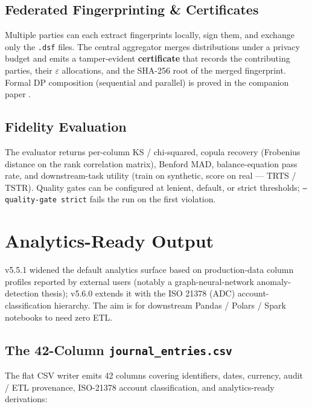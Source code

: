 \documentclass[11pt,a4paper]{article}
\begin{document}
\subsection{Federated Fingerprinting \& Certificates}

Multiple parties can each extract fingerprints locally, sign them, and
exchange only the \texttt{.dsf} files. The central aggregator merges
distributions under a privacy budget and emits a tamper-evident
\textbf{certificate} that records the contributing parties, their
$\varepsilon$ allocations, and the SHA-256 root of the merged fingerprint.
Formal DP composition (sequential and parallel) is proved in the companion
paper \citep{ivertowski2026datasynth}.

\subsection{Fidelity Evaluation}

The evaluator returns per-column KS / chi-squared, copula recovery
(Frobenius distance on the rank correlation matrix), Benford MAD,
balance-equation pass rate, and downstream-task utility (train on synthetic,
score on real --- TRTS / TSTR). Quality gates can be configured at lenient,
default, or strict thresholds; \texttt{--quality-gate strict} fails the run
on the first violation.

\newpage
\section{Analytics-Ready Output}

v5.5.1 widened the default analytics surface based on production-data column
profiles reported by external users (notably a graph-neural-network
anomaly-detection thesis); v5.6.0 extends it with the ISO 21378 (ADC)
account-classification hierarchy. The aim is for downstream Pandas /
Polars / Spark notebooks to need zero ETL.

\subsection{The 42-Column \texttt{journal\_entries.csv}}

The flat CSV writer emits 42 columns covering identifiers, dates, currency,
audit / ETL provenance, ISO-21378 account classification, and analytics-ready
derivations:
\end{document}
